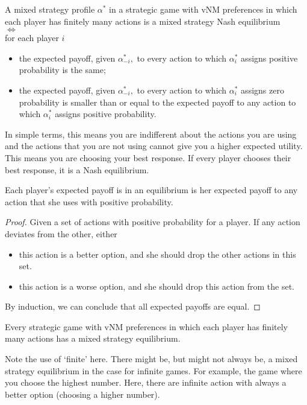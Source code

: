 \begin{proposition}
      \label{2_important}
      A mixed strategy profile $\alpha^{*}$ in a strategic game with vNM preferences in which each player has finitely many actions is a mixed strategy Nash equilibrium\\
      $\iff$\\
      for each player $i$
      \begin{itemize}
            \item the expected payoff, given $\alpha_{-i}^*,$ to every action to which $\alpha_{i}^{*}$ assigns positive probability is the same;
            \item the expected payoff, given $\alpha_{-i}^{*},$ to every action to which $\alpha_{i}^{*}$ assigns zero probability is smaller than or equal to the expected payoff to any action to which $\alpha_{i}^{*}$ assigns positive probability.
      \end{itemize}
\end{proposition}


\begin{note}
      In simple terms, this means you are indifferent about the actions you are using and the actions that you are not using cannot give you a higher expected utility. This means you are choosing your best response. If every player chooses their best response, it is a Nash equilibrium.
\end{note}


\begin{corollary}
      Each player's expected payoff is in an  equilibrium is her expected payoff to any action that she uses with positive probability.
\end{corollary}


\begin{proof}
      Given a set of actions with positive probability for a player. If any action deviates from the other, either
      \begin{itemize}
            \item this action is a better option, and she should drop the other actions in this set.
            \item this action is a worse option, and she should drop this action from the set.
      \end{itemize}
      By induction, we can conclude that all expected payoffs are equal.
\end{proof}


\begin{proposition}
      Every strategic game with vNM preferences in which each player has finitely many actions has a mixed strategy equilibrium.
\end{proposition}
\begin{note}
      Note the use of `finite' here. There might be, but might not always be, a mixed strategy equilibrium in the case for infinite games. For example, the game where you choose the highest number. Here, there are infinite action with always a better option (choosing a higher number).
\end{note}



